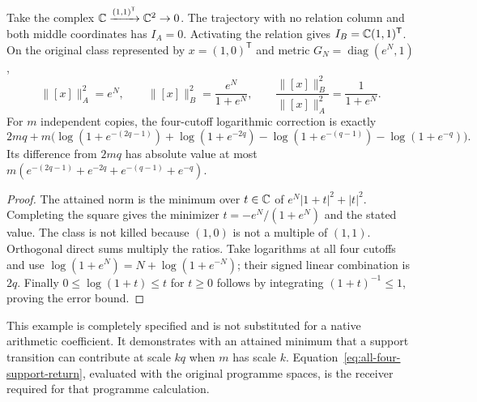 \begin{proposition}\label{prop:evaluated-support-correction}
Take the complex $\mathbb C\xrightarrow{(1,1)^{\mathsf T}}\mathbb C^2\to0$. The trajectory with no relation column and both middle coordinates has $I_A=0$. Activating the relation gives $I_B=\mathbb C(1,1)^{\mathsf T}$. On the original class represented by $x=(1,0)^{\mathsf T}$ and metric $G_N=\operatorname{diag}(e^N,1)$,
\[
 \|[x]\|_A^2=e^N,\qquad
 \|[x]\|_B^2=\frac{e^N}{1+e^N},\qquad
 \frac{\|[x]\|_B^2}{\|[x]\|_A^2}=\frac1{1+e^N}.
\]
For $m$ independent copies, the four-cutoff logarithmic correction is exactly
\begin{equation}\label{eq:evaluated-four-cutoff-defect}
 2mq+m\bigl(\log(1+e^{-(2q-1)})+\log(1+e^{-2q})
 -\log(1+e^{-(q-1)})-\log(1+e^{-q})\bigr).
\end{equation}
Its difference from $2mq$ has absolute value at most
$m(e^{-(2q-1)}+e^{-2q}+e^{-(q-1)}+e^{-q})$.
\end{proposition}
\begin{proof}
The attained norm is the minimum over $t\in\mathbb C$ of $e^N|1+t|^2+|t|^2$. Completing the square gives the minimizer $t=-e^N/(1+e^N)$ and the stated value. The class is not killed because $(1,0)$ is not a multiple of $(1,1)$. Orthogonal direct sums multiply the ratios. Take logarithms at all four cutoffs and use $\log(1+e^N)=N+\log(1+e^{-N})$; their signed linear combination is $2q$. Finally $0\le\log(1+t)\le t$ for $t\ge0$ follows by integrating $(1+t)^{-1}\le1$, proving the error bound.
\end{proof}
This example is completely specified and is not substituted for a native arithmetic coefficient. It demonstrates with an attained minimum that a support transition can contribute at scale $kq$ when $m$ has scale $k$. Equation~\eqref{eq:all-four-support-return}, evaluated with the original programme spaces, is the receiver required for that programme calculation.
